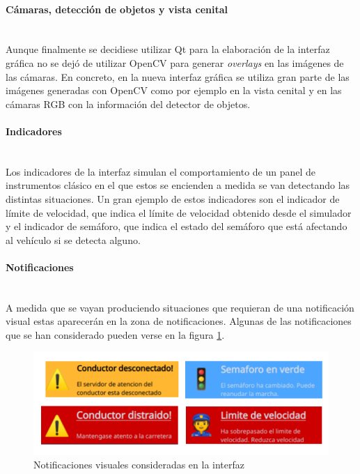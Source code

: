 \clearpage
\paragraph{Cámaras, detección de objetos y vista cenital}\mbox{}\\
Aunque finalmente se decidiese utilizar Qt para la elaboración de la interfaz gráfica no se dejó de utilizar OpenCV para generar \textit{overlays} en las imágenes de las cámaras.
En concreto, en la nueva interfaz gráfica se utiliza gran parte de las imágenes generadas con OpenCV como por ejemplo en la vista cenital y en las cámaras RGB con la información del detector de objetos.

\paragraph{Indicadores}\mbox{}\\

Los indicadores de la interfaz simulan el comportamiento de un panel de instrumentos clásico en el que estos se encienden a medida se van detectando las distintas situaciones. Un gran ejemplo de estos indicadores son el indicador de límite de velocidad, que indica el límite de velocidad obtenido desde el simulador y el indicador de semáforo, que indica el estado del semáforo que está afectando al vehículo si se detecta alguno.

\paragraph{Notificaciones}\mbox{}\\

A medida que se vayan produciendo situaciones que requieran de una notificación visual estas aparecerán en la zona de notificaciones. Algunas de las notificaciones que se han considerado pueden verse en la figura \ref{fig:notificaciones}.

\begin{figure}[h]
    \centering
    \includegraphics[width=0.8\linewidth]{img/Notificaciones.png}
    \caption{Notificaciones visuales consideradas en la interfaz}
    \label{fig:notificaciones}    
\end{figure}


